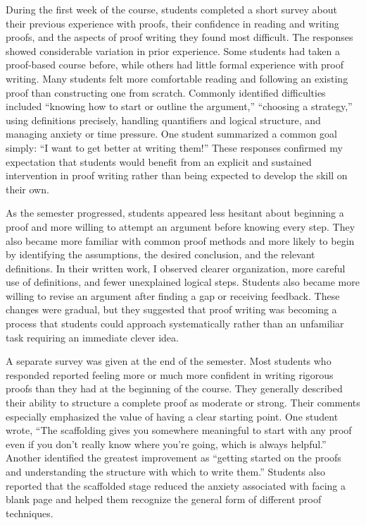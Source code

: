 \documentclass[12pt]{article}
\begin{document}
During the first week of the course, students completed a short survey about their previous experience with proofs, their confidence in reading and writing proofs, and the aspects of proof writing they found most difficult. The responses showed considerable variation in prior experience. Some students had taken a proof-based course before, while others had little formal experience with proof writing. Many students felt more comfortable reading and following an existing proof than constructing one from scratch. Commonly identified difficulties included ``knowing how to start or outline the argument,'' ``choosing a strategy,'' using definitions precisely, handling quantifiers and logical structure, and managing anxiety or time pressure. One student summarized a common goal simply: ``I want to get better at writing them!'' These responses confirmed my expectation that students would benefit from an explicit and sustained intervention in proof writing rather than being expected to develop the skill on their own.

As the semester progressed, students appeared less hesitant about beginning a proof and more willing to attempt an argument before knowing every step. They also became more familiar with common proof methods and more likely to begin by identifying the assumptions, the desired conclusion, and the relevant definitions. In their written work, I observed clearer organization, more careful use of definitions, and fewer unexplained logical steps. Students also became more willing to revise an argument after finding a gap or receiving feedback. These changes were gradual, but they suggested that proof writing was becoming a process that students could approach systematically rather than an unfamiliar task requiring an immediate clever idea.

A separate survey was given at the end of the semester. Most students who responded reported feeling more or much more confident in writing rigorous proofs than they had at the beginning of the course. They generally described their ability to structure a complete proof as moderate or strong. Their comments especially emphasized the value of having a clear starting point. One student wrote, ``The scaffolding gives you somewhere meaningful to start with any proof even if you don't really know where you're going, which is always helpful.'' Another identified the greatest improvement as ``getting started on the proofs and understanding the structure with which to write them.'' Students also reported that the scaffolded stage reduced the anxiety associated with facing a blank page and helped them recognize the general form of different proof techniques.
\end{document}
